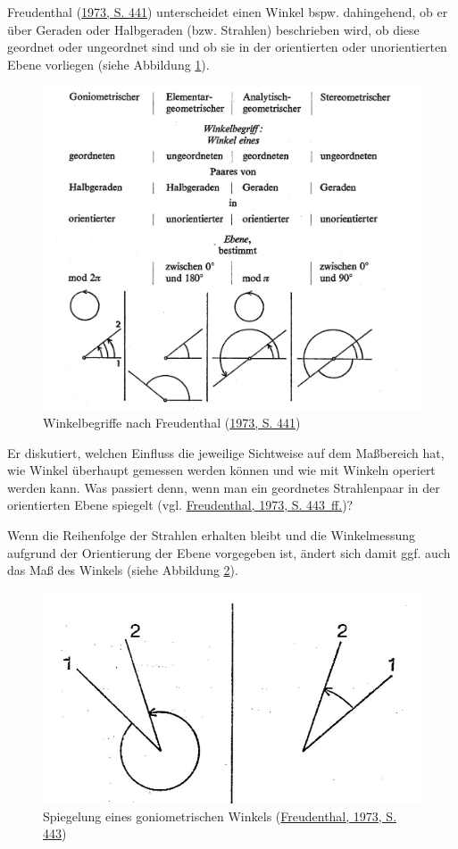 \documentclass[
]{scrbook}
\theoremstyle{definition}
\theoremstyle{definition}
\theoremstyle{definition}
\theoremstyle{definition}
\theoremstyle{remark}
\begin{document}
Freudenthal (\protect\hyperlink{ref-Freudenthal:1973}{1973, S. 441}) unterscheidet einen Winkel bspw. dahingehend, ob er über Geraden oder Halbgeraden (bzw. Strahlen) beschrieben wird, ob diese geordnet oder ungeordnet sind und ob sie in der orientierten oder unorientierten Ebene vorliegen (siehe Abbildung \ref{fig:FreudenthalWinkel}).



\begin{figure}

{\centering \includegraphics[width=0.75\linewidth]{pictures/1-FreudenthalWinkel} 

}

\caption{Winkelbegriffe nach Freudenthal (\protect\hyperlink{ref-Freudenthal:1973}{1973, S. 441})}\label{fig:FreudenthalWinkel}
\end{figure}

Er diskutiert, welchen Einfluss die jeweilige Sichtweise auf dem Maßbereich hat, wie Winkel überhaupt gemessen werden können und wie mit Winkeln operiert werden kann. Was passiert denn, wenn man ein geordnetes Strahlenpaar in der orientierten Ebene spiegelt (vgl. \protect\hyperlink{ref-Freudenthal:1973}{Freudenthal, 1973, S. 443~ff.})?

Wenn die Reihenfolge der Strahlen erhalten bleibt und die Winkelmessung aufgrund der Orientierung der Ebene vorgegeben ist, ändert sich damit ggf. auch das Maß des Winkels (siehe Abbildung \ref{fig:FreudenthalWinkelSpiegeln}).



\begin{figure}

{\centering \includegraphics[width=0.5\linewidth]{pictures/1-FreudenthalWinkelSpiegeln} 

}

\caption{Spiegelung eines goniometrischen Winkels (\protect\hyperlink{ref-Freudenthal:1973}{Freudenthal, 1973, S. 443})}\label{fig:FreudenthalWinkelSpiegeln}
\end{figure}
\end{document}
